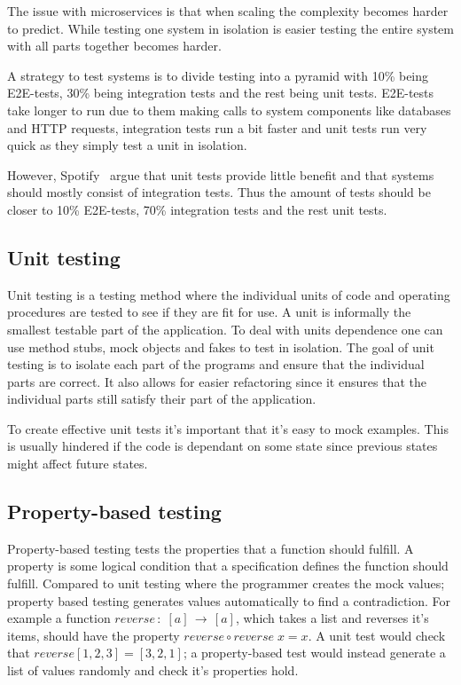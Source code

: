 The issue with microservices is that when scaling the complexity becomes harder
to predict. While testing one system in isolation is easier testing the entire
system with all parts together becomes harder. 

A strategy to test systems is to divide testing into a pyramid with 10\% being
E2E-tests, 30\% being integration tests and the rest being unit tests. E2E-tests
take longer to run due to them making calls to system components like databases
and HTTP requests, integration tests run a bit faster and unit tests run very
quick as they simply test a unit in isolation. 

However, Spotify~\cite{spotifyMicroservice} argue that unit tests provide little
benefit and that systems should mostly consist of integration tests. Thus the
amount of tests should be closer to 10\% E2E-tests, 70\% integration tests and
the rest unit tests.

\subsection{Unit testing}

Unit testing is a testing method where the individual units of code and
operating procedures are tested to see if they are fit for use. A unit is
informally the smallest testable part of the application. To deal with units
dependence one can use method stubs, mock objects and fakes to test in
isolation. The goal of unit testing is to isolate each part of the programs and
ensure that the individual parts are correct. It also allows for easier
refactoring since it ensures that the individual parts still satisfy their part
of the application.

To create effective unit tests it's important that it's easy to mock examples.
This is usually hindered if the code is dependant on some state since previous
states might affect future states.

\subsection{Property-based testing}

Property-based testing tests the properties that a function should fulfill. A
property is some logical condition that a specification defines the function
should fulfill.  Compared to unit testing where the programmer creates the mock
values; property based testing generates values automatically to find a
contradiction. For example a function $reverse\, : \; [a]\, \rightarrow\, [a]$,
which takes a list and reverses it's items, should have the property
$reverse\circ reverse\; x = x$. A unit test would check that $reverse [1,2,3] =
[3,2,1]$; a property-based test would instead generate a list of values randomly
and check it's properties hold.

